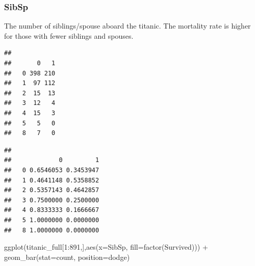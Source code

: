 \documentclass[
]{article}
\newenvironment{Shaded}{\begin{snugshade}}{\end{snugshade}}
\newcommand{\AttributeTok}[1]{\textcolor[rgb]{0.77,0.63,0.00}{#1}}
\newcommand{\DecValTok}[1]{\textcolor[rgb]{0.00,0.00,0.81}{#1}}
\newcommand{\FunctionTok}[1]{\textcolor[rgb]{0.00,0.00,0.00}{#1}}
\newcommand{\NormalTok}[1]{#1}
\newcommand{\SpecialCharTok}[1]{\textcolor[rgb]{0.00,0.00,0.00}{#1}}
\newcommand{\StringTok}[1]{\textcolor[rgb]{0.31,0.60,0.02}{#1}}
\begin{document}
\hypertarget{sibsp}{%
\subsubsection{\texorpdfstring{\textbf{SibSp}}{SibSp}}\label{sibsp}}

The number of siblings/spouse aboard the titanic. The mortality rate is
higher for those with fewer siblings and spouses.

\begin{Shaded}
\end{Shaded}

\begin{verbatim}
##    
##       0   1
##   0 398 210
##   1  97 112
##   2  15  13
##   3  12   4
##   4  15   3
##   5   5   0
##   8   7   0
\end{verbatim}

\begin{Shaded}
\end{Shaded}

\begin{verbatim}
##    
##             0         1
##   0 0.6546053 0.3453947
##   1 0.4641148 0.5358852
##   2 0.5357143 0.4642857
##   3 0.7500000 0.2500000
##   4 0.8333333 0.1666667
##   5 1.0000000 0.0000000
##   8 1.0000000 0.0000000
\end{verbatim}

\begin{Shaded}
\begin{Highlighting}[]
\FunctionTok{ggplot}\NormalTok{(titanic\_full[}\DecValTok{1}\SpecialCharTok{:}\DecValTok{891}\NormalTok{,],}\FunctionTok{aes}\NormalTok{(}\AttributeTok{x=}\NormalTok{SibSp, }\AttributeTok{fill=}\FunctionTok{factor}\NormalTok{(Survived))) }\SpecialCharTok{+}
  \FunctionTok{geom\_bar}\NormalTok{(}\AttributeTok{stat=}\StringTok{\textquotesingle{}count\textquotesingle{}}\NormalTok{, }\AttributeTok{position=}\StringTok{\textquotesingle{}dodge\textquotesingle{}}\NormalTok{)}
\end{Highlighting}
\end{Shaded}
\end{document}
